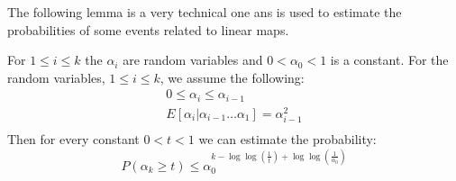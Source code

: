 The following lemma is a very technical one ans is used to estimate the probabilities of some events related to linear maps.
\begin{lemma}
\label{lemma-random-variable}
For $1 \leq i \leq k$ the $\alpha_i$ are random variables and $0 < \alpha_0 < 1$ is a constant. For the random variables, $1 \leq i \leq k$, we assume the following:
\begin{gather*}
0 \leq \alpha_i \leq \alpha_{i - 1} \\
E[ \alpha_i | \alpha_{i-1} \dots \alpha_1 ] = \alpha_{i-1}^{2} \\
\end{gather*}
Then for every constant $0 < t < 1$ we can estimate the probability:
\begin{displaymath}
P(\alpha_k \geq t) \leq \alpha_0^{k - \log \log (\frac{1}{t}) + \log \log \left(\frac{1}{\alpha_0}\right)}
\end{displaymath}
\end{lemma}
